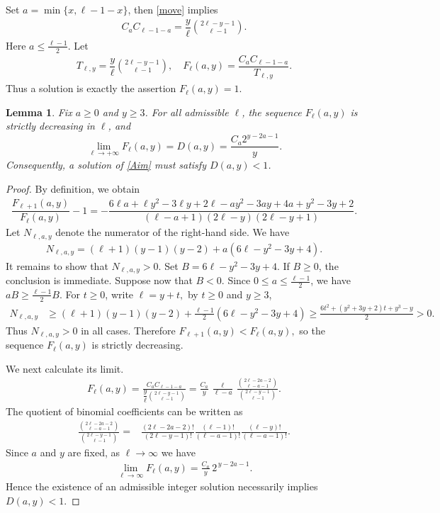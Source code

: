 \documentclass[11pt]{article}
\newtheorem{lem}[thm]{Lemma}
\begin{document}
Set $a=\min\{x,\ell-1-x\}$, then \eqref{move} 
implies
\begin{align}\label{Aim}
   C_aC_{\ell-1-a}=\dfrac y\ell\binom{2\ell-y-1}{\ell-1}. 
\end{align}
Here $a\le\frac{\ell-1}2$. 
Let
\begin{align*}
T_{\ell,y}=\dfrac y\ell\binom{2\ell-y-1}{\ell-1},\quad F_\ell(a,y)=\dfrac{C_aC_{\ell-1-a}}{T_{\ell,y}}.    
\end{align*}
Thus a solution is exactly the assertion $F_\ell(a,y)=1$.
\begin{lem}\label{F_decresing}
Fix $a\ge0$ and $y\ge3$. For all admissible $\ell$, the sequence $F_\ell(a,y)$
is strictly decreasing in $\ell$, and\[
\lim_{\ell\to+\infty}F_\ell(a,y)=D(a,y)=\dfrac{C_a2^{y-2a-1}}{y}.
\]
Consequently, a solution of \eqref{Aim} must satisfy $D(a,y)<1$.
\end{lem}
\begin{proof}
By definition, we obtain
\begin{align*}
\dfrac{F_{\ell+1}(a,y)}{F_\ell(a,y)}-1=-\dfrac{6\ell a+\ell y^2-3\ell y+2\ell-ay^2-3ay+4a+y^2-3y+2}{(\ell-a+1)(2\ell-y)(2\ell-y+1)}.    
\end{align*}
Let $N_{\ell,a,y}$ denote the numerator of the right-hand side. We have
\begin{align*}
    N_{\ell,a,y}
=
(\ell+1)(y-1)(y-2)
+
a(6\ell-y^2-3y+4).
\end{align*}
It remains to show that $N_{\ell,a,y}>0$. Set
$B=6\ell-y^2-3y+4$.
If $B\ge0$, the conclusion is immediate.
Suppose now that $B<0$. Since $0\le a\le\frac{\ell-1}{2}$, we have $aB\ge\frac{\ell-1}{2}B$.
For $t\ge0$, write $\ell=y+t,$
by $t\ge0$ and $y\ge3$,
\begin{align*}
N_{\ell,a,y}
&\ge
(\ell+1)(y-1)(y-2)
+
\frac{\ell-1}{2}
(6\ell-y^2-3y+4)\ge
\frac{
6t^2+(y^2+3y+2)t+y^3-y
}{2}>0.
\end{align*}
Thus $N_{\ell,a,y}>0$ in all cases.
Therefore
$F_{\ell+1}(a,y)<F_\ell(a,y),$
so the sequence $F_\ell(a,y)$ is strictly decreasing.

We next calculate its limit. 
\begin{align*}
F_\ell(a,y)
=
\frac{C_aC_{\ell-1-a}}
{\dfrac{y}{\ell}
 \binom{2\ell-y-1}{\ell-1}}=
\frac{C_a}{y}\,
\frac{\ell}{\ell-a}\,
\frac{
\binom{2\ell-2a-2}{\ell-a-1}
}{
\binom{2\ell-y-1}{\ell-1}
}.
\end{align*}
The quotient of binomial coefficients can be written as
\begin{align*}
\frac{
\binom{2\ell-2a-2}{\ell-a-1}
}{
\binom{2\ell-y-1}{\ell-1}
}
={}&
\frac{(2\ell-2a-2)!}{(2\ell-y-1)!}
\frac{(\ell-1)!}{(\ell-a-1)!}
\frac{(\ell-y)!}{(\ell-a-1)!}.
\end{align*}
Since $a$ and $y$ are fixed, as $\ell\to\infty$ we have
\begin{align*}
\lim_{\ell\to\infty}F_\ell(a,y)
=
\frac{C_a}{y}\,2^{\,y-2a-1}.
\end{align*}
Hence the existence of an admissible integer solution necessarily
implies $D(a,y)<1$.
\end{proof}
\end{document}
